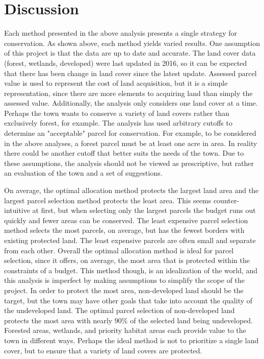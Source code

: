 \documentclass[12pt, stu, floatsintext,table]{apa7}
\begin{document}
\section{Discussion}
Each method presented in the above analysis presents a single strategy for conservation. As shown above, each method yields varied results. One assumption of this project is that the data are up to date and accurate. The land cover data (forest, wetlands, developed) were last updated in 2016, so it can be expected that there has been change in land cover since the latest update. Assessed parcel value is used to represent the cost of land acquisition, but it is a simple representation, since there are more elements to acquiring land than simply the assessed value. Additionally, the analysis only considers one land cover at a time. Perhaps the town wants to conserve a variety of land covers rather than exclusively forest, for example. The analysis has used arbitrary cutoffs to determine an "acceptable" parcel for conservation. For example, to be considered in the above analyses, a forest parcel must be at least one acre in area. In reality there could be another cutoff that better suits the needs of the town. Due to these assumptions, the analysis should not be viewed as prescriptive, but rather an evaluation of the town and a set of suggestions.     

On average, the optimal allocation method protects the largest land area and the largest parcel selection method protects the least area. This seems counter-intuitive at first, but when selecting only the largest parcels the budget runs out quickly and fewer areas can be conserved. The least expensive parcel selection method selects the most parcels, on average, but has the fewest borders with existing protected land. The least expensive parcels are often small and separate from each other.  
Overall the optimal allocation method is ideal for parcel selection, since it offers, on average, the most area that is protected within the constraints of a budget. This method though, is an idealization of the world, and this analysis is imperfect by making assumptions to simplify the scope of the project. In order to protect the most area, non-developed land should be the target, but the town may have other goals that take into account the quality of the undeveloped land. The optimal parcel selection of non-developed land protects the most area with nearly 90\% of the selected land being undeveloped. Forested areas, wetlands, and priority habitat areas each provide value to the town in different ways. Perhaps the ideal method is not to prioritize a single land cover, but to ensure that a variety of land covers are protected. 
\end{document}
